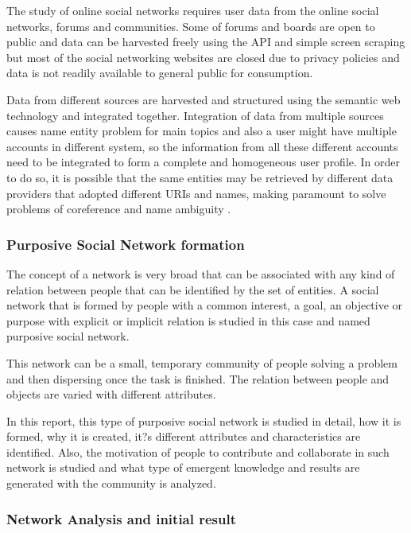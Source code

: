 The study of online social networks requires user data from the online social networks, forums and communities. Some of forums and boards are open to public and data can be harvested freely using the API and simple screen scraping but most of the social networking websites are closed due to privacy policies and data is not readily available to general public for consumption.

Data from different sources are harvested and structured using the semantic web technology and integrated together. Integration of data from multiple sources causes name entity problem for main topics and also a user might have multiple accounts in different system, so the information from all these different accounts need to be integrated to form a complete and homogeneous user profile. In order to do so, it is possible that the same entities may be retrieved by different data providers that adopted different URIs and names, making paramount to solve problems of coreference and name ambiguity \cite{glaser2007coreference}.

\subsubsection{Purposive Social Network formation}

The concept of a network is very broad that can be associated with any kind of relation between people that can be identified by the set of entities. A social network that is formed by people with a common interest, a goal, an objective or purpose with explicit or implicit relation is studied in this case and named purposive social network.

This network can be a small, temporary community of people solving a problem and then dispersing once the task is finished. The relation between people and objects are varied with different attributes.

In this report, this type of purposive social network is studied in detail, how it is formed, why it is created, it?s different attributes and characteristics are identified. Also, the motivation of people to contribute and collaborate in such network is studied and what type of emergent knowledge and results are generated with the community is analyzed.

\subsubsection{Network Analysis and initial result}

